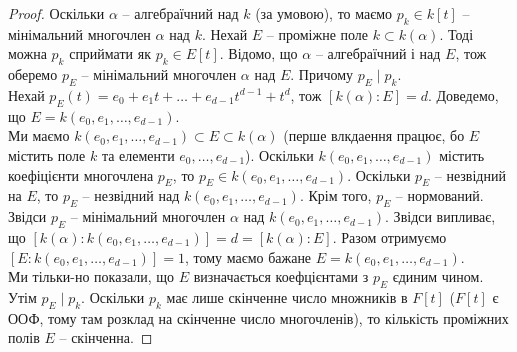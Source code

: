 \documentclass{math_library}
\begin{document}
\begin{proof}
Оскільки $\alpha$ -- алгебраїчний над $k$ (за умовою), то маємо $p_k \in k[t]$ -- мінімальний многочлен $\alpha$ над $k$. Нехай $E$ -- проміжне поле $k \subset k(\alpha)$. Тоді можна $p_k$ сприймати як $p_k \in E[t]$. Відомо, що $\alpha$ -- алгебраїчний і над $E$, тож оберемо $p_E$ -- мінімальний многочлен $\alpha$ над $E$. Причому $p_E \mid p_k$.\\
Нехай $p_E(t) = e_0 + e_1 t + \dots + e_{d-1} t^{d-1} + t^d$, тож $[k(\alpha):E] = d$. Доведемо, що $E = k(e_0,e_1,\dots,e_{d-1})$.\\
Ми маємо $k(e_0,e_1,\dots,e_{d-1}) \subset E \subset k(\alpha)$ (перше влкдаення працює, бо $E$ містить поле $k$ та елементи $e_0,\dots,e_{d-1}$). Оскільки $k(e_0,e_1,\dots,e_{d-1})$ містить коефіцієнти многочлена $p_E$, то $p_E \in k(e_0,e_1,\dots,e_{d-1})$. Оскільки $p_E$ -- незвідний на $E$, то $p_E$ -- незвідний над $k(e_0,e_1,\dots,e_{d-1})$. Крім того, $p_E$ -- нормований. Звідси $p_E$ -- мінімальний многочлен $\alpha$ над $k(e_0,e_1,\dots,e_{d-1})$. Звідси випливає, що $[k(\alpha) : k(e_0,e_1,\dots,e_{d-1})] = d = [k(\alpha) : E]$. Разом отримуємо $[E: k(e_0,e_1,\dots,e_{d-1})] = 1$, тому маємо бажане $E = k(e_0,e_1,\dots,e_{d-1})$.\\
Ми тільки-но показали, що $E$ визначається коефцієнтами з $p_E$ єдиним чином. Утім $p_E \mid p_k$. Оскільки $p_k$ має лише скінченне число множників в $F[t]$ ($F[t]$ є ООФ, тому там розклад на скінченне число многочленів), то кількість проміжних полів $E$ -- скінченна.
\end{proof}

\end{document}

